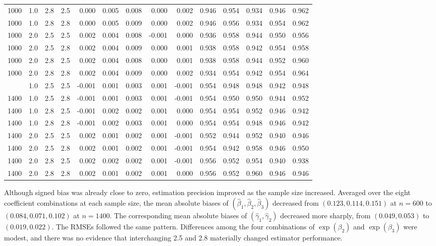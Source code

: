 \begin{table}[!htbp]
{\begin{tabular}{ccccrrrrrrrrrr}
1000 & 1.0 & 2.8 & 2.5 & 0.000 & 0.005 & 0.008 &  0.000 & 0.002 & 0.946 & 0.954 & 0.934 & 0.946 & 0.962 \\
1000 & 1.0 & 2.8 & 2.8 & 0.000 & 0.005 & 0.009 &  0.000 & 0.002 & 0.946 & 0.956 & 0.934 & 0.954 & 0.962 \\
1000 & 2.0 & 2.5 & 2.5 & 0.002 & 0.004 & 0.008 & -0.001 & 0.000 & 0.936 & 0.958 & 0.944 & 0.950 & 0.956 \\
1000 & 2.0 & 2.5 & 2.8 & 0.002 & 0.004 & 0.009 &  0.000 & 0.001 & 0.938 & 0.958 & 0.942 & 0.954 & 0.958 \\
1000 & 2.0 & 2.8 & 2.5 & 0.002 & 0.004 & 0.008 &  0.000 & 0.001 & 0.938 & 0.958 & 0.944 & 0.952 & 0.960 \\
1000 & 2.0 & 2.8 & 2.8 & 0.002 & 0.004 & 0.009 &  0.000 & 0.002 & 0.934 & 0.954 & 0.942 & 0.954 & 0.964 \\
\addlinespace
1400 & 1.0 & 2.5 & 2.5 & -0.001 & 0.001 & 0.003 & 0.001 & -0.001 & 0.954 & 0.948 & 0.948 & 0.942 & 0.948 \\
1400 & 1.0 & 2.5 & 2.8 & -0.001 & 0.001 & 0.003 & 0.001 & -0.001 & 0.954 & 0.950 & 0.950 & 0.944 & 0.952 \\
1400 & 1.0 & 2.8 & 2.5 & -0.001 & 0.002 & 0.002 & 0.001 &  0.000 & 0.954 & 0.954 & 0.952 & 0.946 & 0.942 \\
1400 & 1.0 & 2.8 & 2.8 & -0.001 & 0.002 & 0.003 & 0.001 &  0.000 & 0.954 & 0.954 & 0.948 & 0.946 & 0.942 \\
1400 & 2.0 & 2.5 & 2.5 &  0.002 & 0.001 & 0.002 & 0.001 & -0.001 & 0.952 & 0.944 & 0.952 & 0.940 & 0.946 \\
1400 & 2.0 & 2.5 & 2.8 &  0.002 & 0.001 & 0.002 & 0.001 & -0.001 & 0.954 & 0.942 & 0.958 & 0.946 & 0.950 \\
1400 & 2.0 & 2.8 & 2.5 &  0.002 & 0.002 & 0.002 & 0.001 & -0.001 & 0.956 & 0.952 & 0.954 & 0.940 & 0.938 \\
1400 & 2.0 & 2.8 & 2.8 &  0.002 & 0.001 & 0.002 & 0.001 &  0.000 & 0.956 & 0.952 & 0.960 & 0.946 & 0.946 \\
\bottomrule
\end{tabular}}
\label{tab:simuResBetaGrid}
\end{table}

Although signed bias was already close to zero, estimation precision improved as the sample size increased. Averaged over the eight coefficient combinations at each sample size, the mean absolute biases of $(\hat\beta_1,\hat\beta_2,\hat\beta_3)$ decreased from $(0.123,0.114,0.151)$ at $n=600$ to $(0.084,0.071,0.102)$ at $n=1400$. The corresponding mean absolute biases of $(\hat\gamma_1,\hat\gamma_2)$ decreased more sharply, from $(0.049,0.053)$ to $(0.019,0.022)$. The RMSEs followed the same pattern. Differences among the four combinations of $\exp(\beta_2)$ and $\exp(\beta_3)$ were modest, and there was no evidence that interchanging 2.5 and 2.8 materially changed estimator performance.

